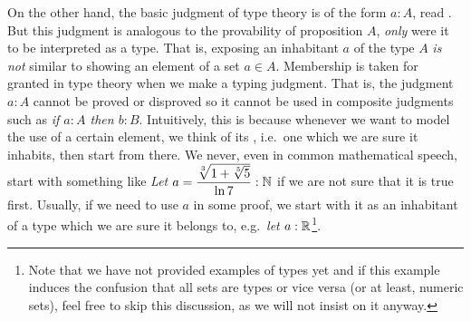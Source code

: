 On the other hand, the basic judgment of type theory is of the form $ a : A $,
read . But this judgment is analogous
to the provability of proposition $ A $, \emph{only} were it to be interpreted as a type.
That is, exposing an inhabitant $ a $ of the type $ A $ \emph{is not} similar to
showing an element of a set $ a \in A $. Membership is taken for granted in type
theory when we make a typing judgment. That is, the judgment $ a : A $ cannot
be proved or disproved so it cannot be used in composite judgments such as
\emph{if $ a : A $ then $ b : B $}. Intuitively, this is because whenever we
want to model the use of a certain element, we think of its ,
i.e.\ one which we are sure it inhabits, then start from there. We never,
even in common mathematical speech, start with something like
\emph{Let $ a = \dfrac{\sqrt[3]{1 + \sqrt[5]{5}}}{\ln 7} : \mathbb{N} $} if we are not sure
that it is true first. Usually, if we need to use $ a $ in some proof,
we start with it as an inhabitant of a type which we are sure it belongs to,
e.g.\ \emph{let $ a : \mathbb{R} $}\footnote{Note that we have not provided examples
  of types yet and if this example induces the confusion that all sets are
  types or vice versa (or at least, numeric sets), feel free to skip this
  discussion, as we will not insist on it anyway.}.

